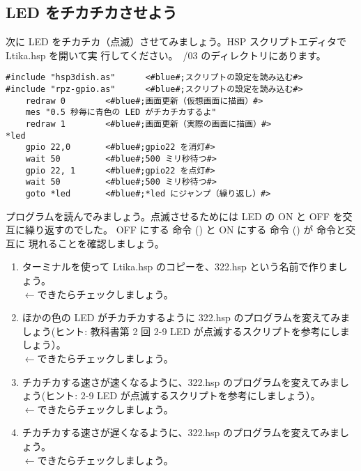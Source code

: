 \subsection{LED をチカチカさせよう}

次に LED をチカチカ（点滅）させてみましょう。HSP スクリプトエディタで Ltika.hsp を開いて実
行してください。~/03 のディレクトリにあります。\\

\begin{lstlisting}[caption=Ltika.hsp,label=Ltika.hsp]
#include "hsp3dish.as"		<#blue#;スクリプトの設定を読み込む#>
#include "rpz-gpio.as"		<#blue#;スクリプトの設定を読み込む#>
	redraw 0		<#blue#;画面更新（仮想画面に描画）#>
	mes "0.5 秒毎に青色の LED がチカチカするよ"
	redraw 1		<#blue#;画面更新（実際の画面に描画）#>
*led
	gpio 22,0		<#blue#;gpio22 を消灯#>
	wait 50 		<#blue#;500 ミリ秒待つ#>
	gpio 22, 1 		<#blue#;gpio22 を点灯#>
	wait 50 		<#blue#;500 ミリ秒待つ#>
	goto *led 		<#blue#;*led にジャンプ（繰り返し）#>
\end{lstlisting}

プログラムを読んでみましょう。点滅させるためには LED の ON と OFF を交互に繰り返すのでした。
OFF にする  命令 () と ON にする  命令 () が  命令と交互に
現れることを確認しましょう。\\

\begin{tcolorbox}[title=\useOmetoi]
\begin{enumerate}
\item ターミナルを使って Ltika.hsp のコピーを、322.hsp という名前で作りましょう。\\
\fbox{\phantom{白}} $\leftarrow$できたらチェックしましょう。
\item ほかの色の LED がチカチカするように 322.hsp のプログラムを変えてみましょう(ヒント:
教科書第 2 回 2-9 LED が点滅するスクリプトを参考にしましょう）。\\
\fbox{\phantom{白}} $\leftarrow$できたらチェックしましょう。
\item チカチカする速さが速くなるように、322.hsp のプログラムを変えてみましょう(ヒント: 2-9 
LED が点滅するスクリプトを参考にしましょう）。\\
\fbox{\phantom{白}} $\leftarrow$できたらチェックしましょう。
\item チカチカする速さが遅くなるように、322.hsp のプログラムを変えてみましょう。\\
\fbox{\phantom{白}} $\leftarrow$できたらチェックしましょう。
\end{enumerate}
\end{tcolorbox}
